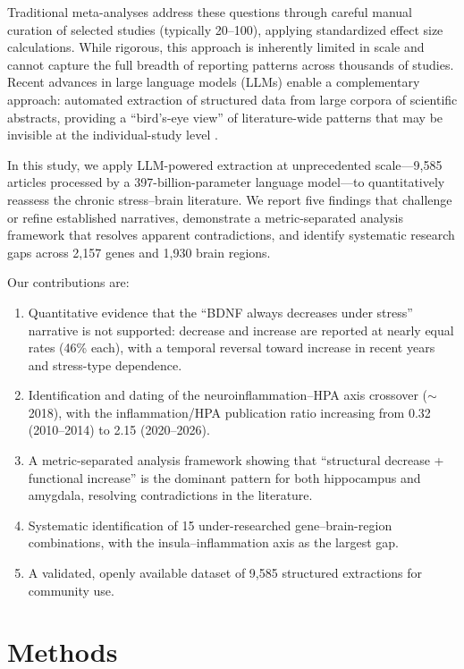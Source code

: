 \documentclass[12pt,a4paper]{article}
\begin{document}
Traditional meta-analyses address these questions through careful manual curation of selected studies (typically 20--100), applying standardized effect size calculations. While rigorous, this approach is inherently limited in scale and cannot capture the full breadth of reporting patterns across thousands of studies. Recent advances in large language models (LLMs) enable a complementary approach: automated extraction of structured data from large corpora of scientific abstracts, providing a ``bird's-eye view'' of literature-wide patterns that may be invisible at the individual-study level \citep{wang2023}.

In this study, we apply LLM-powered extraction at unprecedented scale---9,585 articles processed by a 397-billion-parameter language model---to quantitatively reassess the chronic stress--brain literature. We report five findings that challenge or refine established narratives, demonstrate a metric-separated analysis framework that resolves apparent contradictions, and identify systematic research gaps across 2,157 genes and 1,930 brain regions.

Our contributions are:
\begin{enumerate}
    \item Quantitative evidence that the ``BDNF always decreases under stress'' narrative is not supported: decrease and increase are reported at nearly equal rates (46\% each), with a temporal reversal toward increase in recent years and stress-type dependence.
    \item Identification and dating of the neuroinflammation--HPA axis crossover ($\sim$2018), with the inflammation/HPA publication ratio increasing from 0.32 (2010--2014) to 2.15 (2020--2026).
    \item A metric-separated analysis framework showing that ``structural decrease + functional increase'' is the dominant pattern for both hippocampus and amygdala, resolving contradictions in the literature.
    \item Systematic identification of 15 under-researched gene--brain-region combinations, with the insula--inflammation axis as the largest gap.
    \item A validated, openly available dataset of 9,585 structured extractions for community use.
\end{enumerate}

\section{Methods}
\end{document}
